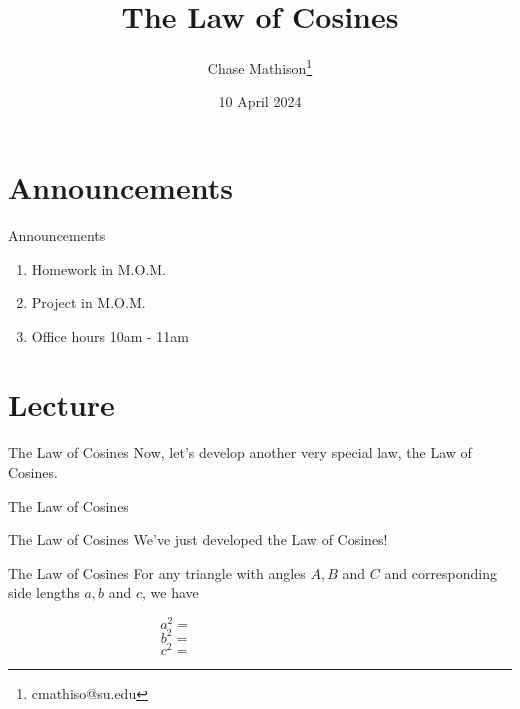 \documentclass[presentation]{beamer}
\institute[SU]{Shenandoah University}
\author{Chase Mathison\thanks{cmathiso@su.edu}}
\date{10 April 2024}
\title{The Law of Cosines}
\begin{document}
\maketitle

\section{Announcements}
\label{sec:org52ab2c0}
\begin{frame}[label={sec:org15bca4f}]{Announcements}
\begin{enumerate}
\item Homework in M.O.M.
\item Project in M.O.M.
\item Office hours 10am - 11am
\end{enumerate}
\end{frame}

\section{Lecture}
\label{sec:org2d1f5ab}
\begin{frame}[label={sec:orgd6e304f}]{The Law of Cosines}
Now, let's develop another very special law, the Law of Cosines.

\begin{center}
\end{center}

\vspace{10in}
\end{frame}

\begin{frame}[label={sec:org4c169b7}]{The Law of Cosines}
\end{frame}

\begin{frame}[label={sec:org9739c74}]{The Law of Cosines}
We've just developed the Law of Cosines!

\begin{block}{The Law of Cosines}
For any triangle with angles \(A,B\) and \(C\) and corresponding side lengths \(a,b\) and \(c\), we have

\[
a^2 = \hspace{2in}\]
\[
b^2 = \hspace{2in}\]
\[
c^2 = \hspace{2in}\]
\end{block}
\end{frame}
\end{document}
